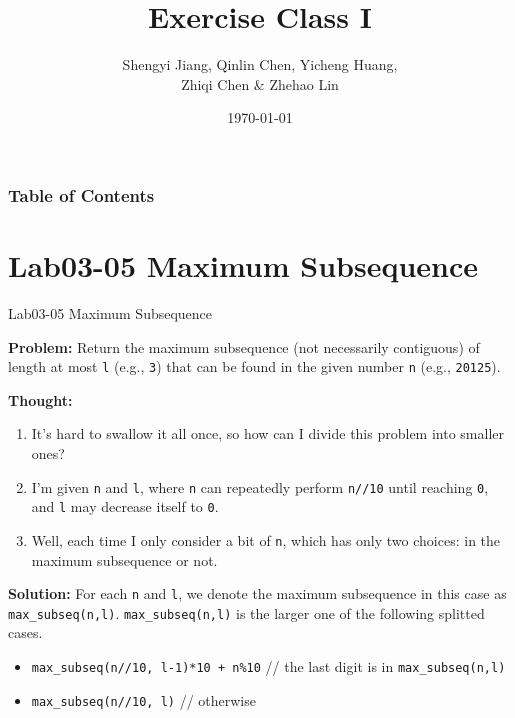 \documentclass[aspectratio=169]{beamer}
\title{Exercise Class I}
\author{Shengyi Jiang, Qinlin Chen, Yicheng Huang, \\ Zhiqi Chen \& Zhehao Lin}
\date{\today}
\begin{document}
\frame{\titlepage}


\begin{frame}
\frametitle{Table of Contents}
\vspace{-5mm}
\tableofcontents[hidesubsections]
\end{frame}

\section{Lab03-05 Maximum Subsequence}
\begin{frame}{Lab03-05 Maximum Subsequence}

    \textbf{Problem:} Return the maximum subsequence (not necessarily contiguous) of length at most \texttt{l} (e.g., \texttt{3}) that can be found in the given number \texttt{n} (e.g., \texttt{20125}).
    
    \textbf{Thought:} 
    
    \begin{enumerate}
        \item It's hard to swallow it all once, so how can I divide this problem into smaller ones?
        \item I'm given \texttt{n} and \texttt{l}, where \texttt{n} can repeatedly perform \texttt{n//10} until reaching \texttt{0}, and \texttt{l} may decrease itself to \texttt{0}.
        \item Well, each time I only consider a bit of \texttt{n}, which has only two choices: in the maximum subsequence or not.
    \end{enumerate}
    
    \textbf{Solution:} For each \texttt{n} and \texttt{l}, we denote the maximum subsequence in this case as \texttt{max\_subseq(n,l)}. \texttt{max\_subseq(n,l)} is the larger one of the following splitted cases.
    \begin{itemize}
        \item \texttt{max\_subseq(n//10, l-1)*10 + n\%10}  // the last digit is in \texttt{max\_subseq(n,l)}
        \item \texttt{max\_subseq(n//10, l)}  // otherwise
    \end{itemize}
    
\end{frame}
\end{document}
